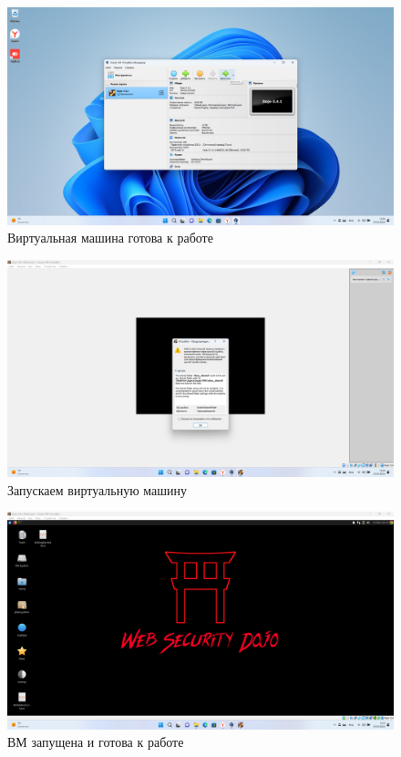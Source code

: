 \documentclass[a4paper]{article}
\begin{document}
  \begin{figure}[H]
    \centering
    \includegraphics[width=\textwidth]{Screenshot_7}
    \caption{Виртуальная машина готова к работе}
  \end{figure}

  \begin{figure}[H]
    \centering
    \includegraphics[width=\textwidth]{Screenshot_8}
    \caption{Запускаем виртуальную машину}
  \end{figure}

  \begin{figure}[H]
    \centering
    \includegraphics[width=\textwidth]{Screenshot_10}
    \caption{ВМ запущена и готова к работе}
  \end{figure}
\end{document}
